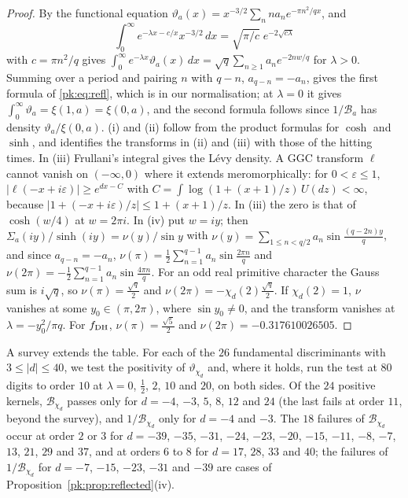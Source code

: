 \begin{proof}
By the functional equation $\vartheta_a(x)=x^{-3/2}\sum_nna_ne^{-\pi n^2/qx}$, and
\[
\int_0^\infty e^{-\lambda x-c/x}x^{-3/2}\,dx=\sqrt{\pi/c}\;e^{-2\sqrt{c\lambda}}
\]
with $c=\pi n^2/q$ gives $\int_0^\infty e^{-\lambda x}\vartheta_a(x)\,dx=\sqrt q\sum_{n\ge1}a_ne^{-2nw/q}$ for $\lambda>0$. Summing over a period and pairing $n$ with $q-n$, $a_{q-n}=-a_n$, gives the first formula of \eqref{pk:eq:refl}, which is \cite[(96)]{BPY01} in our normalisation; at $\lambda=0$ it gives $\int_0^\infty\vartheta_a=\xi(1,a)=\xi(0,a)$, and the second formula follows since $1/\mathcal B_a$ has density $\vartheta_a/\xi(0,a)$. (i) and (ii) follow from the product formulas for $\cosh$ and $\sinh$, and \cite[(92)]{BPY01} identifies the transforms in (ii) and (iii) with those of the hitting times. In (iii) Frullani's integral gives the L\'evy density. A GGC transform $\ell$ cannot vanish on $(-\infty,0)$ where it extends meromorphically: for $0<\varepsilon\le1$, $|\ell(-x+i\varepsilon)|\ge e^{dx-C}$ with $C=\int\log(1+(x+1)/z)\,U(dz)<\infty$, because $|1+(-x+i\varepsilon)/z|\le1+(x+1)/z$. In (iii) the zero is that of $\cosh(w/4)$ at $w=2\pi i$. In (iv) put $w=iy$; then $\Sigma_a(iy)/\sinh(iy)=\nu(y)/\sin y$ with $\nu(y)=\sum_{1\le n<q/2}a_n\sin\frac{(q-2n)y}q$, and since $a_{q-n}=-a_n$, $\nu(\pi)=\frac12\sum_{n=1}^{q-1}a_n\sin\frac{2\pi n}q$ and $\nu(2\pi)=-\frac12\sum_{n=1}^{q-1}a_n\sin\frac{4\pi n}q$. For an odd real primitive character the Gauss sum is $i\sqrt q$, so $\nu(\pi)=\frac{\sqrt q}2$ and $\nu(2\pi)=-\chi_d(2)\frac{\sqrt q}2$. If $\chi_d(2)=1$, $\nu$ vanishes at some $y_0\in(\pi,2\pi)$, where $\sin y_0\ne0$, and the transform vanishes at $\lambda=-y_0^2/\pi q$. For $f_{\rm DH}$, $\nu(\pi)=\frac{\sqrt5}2$ and $\nu(2\pi)=-0.317610026505$.
\end{proof}

A survey extends the table. For each of the $26$ fundamental discriminants with $3\le|d|\le40$, we test the positivity of $\vartheta_{\chi_d}$ and, where it holds, run the test at $80$ digits to order $10$ at $\lambda=0$, $\frac12$, $2$, $10$ and $20$, on both sides. Of the $24$ positive kernels, $\mathcal B_{\chi_d}$ passes only for $d=-4$, $-3$, $5$, $8$, $12$ and $24$ (the last fails at order $11$, beyond the survey), and $1/\mathcal B_{\chi_d}$ only for $d=-4$ and $-3$. The $18$ failures of $\mathcal B_{\chi_d}$ occur at order $2$ or $3$ for $d=-39$, $-35$, $-31$, $-24$, $-23$, $-20$, $-15$, $-11$, $-8$, $-7$, $13$, $21$, $29$ and $37$, and at orders $6$ to $8$ for $d=17$, $28$, $33$ and $40$; the failures of $1/\mathcal B_{\chi_d}$ for $d=-7$, $-15$, $-23$, $-31$ and $-39$ are cases of Proposition~\ref{pk:prop:reflected}(iv).

